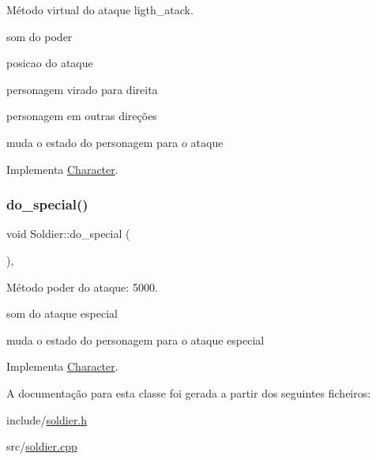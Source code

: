 Método virtual do ataque ligth\+\_\+atack. 

som do poder

posicao do ataque

personagem virado para direita

personagem em outras direções

muda o estado do personagem para o ataque 

Implementa \mbox{\hyperlink{classCharacter_ae45be8b8b1a7d2f54a2349a65e2e6c42}{Character}}.

\mbox{\label{classSoldier_a3e5574a74b969d5b26cf3ad0f3f7f085}} 
\subsubsection{\texorpdfstring{do\+\_\+special()}{do\_special()}}
{\footnotesize\ttfamily void Soldier\+::do\+\_\+special (\begin{DoxyParamCaption}{ }\end{DoxyParamCaption})\hspace{0.3cm}{\ttfamily [protected]}, {\ttfamily [virtual]}}



Método poder do ataque\+: 5000. 

som do ataque especial

muda o estado do personagem para o ataque especial 

Implementa \mbox{\hyperlink{classCharacter_a447eb9fa4afa57619d6387e0ea178f93}{Character}}.



A documentação para esta classe foi gerada a partir dos seguintes ficheiros\+:\begin{DoxyCompactItemize}
\item 
include/\mbox{\hyperlink{soldier_8h}{soldier.\+h}}\item 
src/\mbox{\hyperlink{soldier_8cpp}{soldier.\+cpp}}\end{DoxyCompactItemize}
